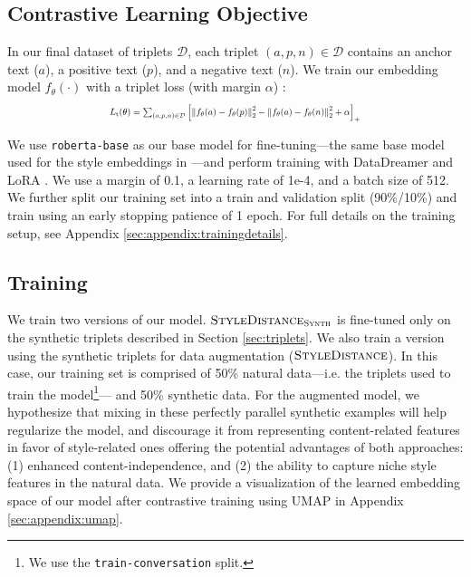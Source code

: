\subsection{Contrastive Learning Objective}

In our final dataset of triplets $\mathcal{D}$, each triplet $(a, p, n) \in \mathcal{D}$ contains an anchor text ($a$), a positive text ($p$), and a negative text ($n$). We train our embedding model $f_{\theta}(\cdot)$ with a triplet loss (with margin $\alpha$) \citep{tripletloss}:
\[
\scalebox{0.72}{
    $L_{\text{t}}(\theta) = \sum_{(a, p, n) \in \mathcal{D}} \left[\left\|f_\theta(a) - f_\theta(p)\right\|_2^2 - \left\|f_\theta(a) - f_\theta(n)\right\|_2^2 + \alpha\right]_{+}$
}
\]

\noindent We use \texttt{roberta-base} as our base model for fine-tuning---the same base model used for the style embeddings in \citet{styleemb}---and perform training with DataDreamer and LoRA \citep{datadreamer,lora}. We use a margin of 0.1, a learning rate of 1e-4, and a batch size of 512. We further split our training set %
into a train and validation split (90\%/10\%) and train using an early stopping patience of 1 epoch. For full details on the training setup, see Appendix \ref{sec:appendix:trainingdetails}.

\stelevaltable
\ablationtable

\subsection{Training}

We train two versions of our model. $\textsc{StyleDistance}_{\textsc{Synth}}$ is fine-tuned only on the synthetic triplets described in Section \ref{sec:triplets}. We also train a version %
using the synthetic triplets for %
data augmentation ($\textsc{StyleDistance}$). In this case, our training set is comprised of %
50\% natural data---i.e. the triplets used to train the \citet{styleemb} model\footnote{We use the \texttt{train-conversation} split.}--- and 50\% synthetic data. For the augmented model, we hypothesize that mixing in these perfectly parallel synthetic examples will help regularize the model, and discourage it from representing content-related features in favor of style-related ones offering the potential advantages of both approaches: (1) enhanced content-independence, and (2) the ability to capture niche style features in the natural data. We provide a visualization of the learned embedding space of our model after contrastive training using UMAP \citep{umap} in Appendix \ref{sec:appendix:umap}. %

